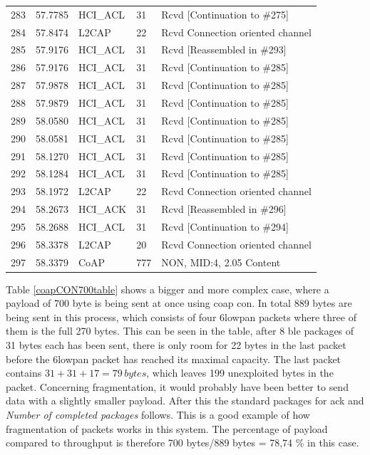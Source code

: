 \begin{table}[H]
\begin{tabular}{lllll}
283    & 57.7785 & HCI\_ACL & 31     & Rcvd {[}Continuation to \#275{]} \\
284    & 57.8474 & L2CAP    & 22     & Rcvd Connection oriented channel \\
285    & 57.9176 & HCI\_ACL & 31     & Rcvd {[}Reassembled in \#293{]}  \\
286    & 57.9176 & HCI\_ACL & 31     & Rcvd {[}Continuation to \#285{]} \\
287    & 57.9878 & HCI\_ACL & 31     & Rcvd {[}Continuation to \#285{]} \\
288    & 57.9879 & HCI\_ACL & 31     & Rcvd {[}Continuation to \#285{]} \\
289    & 58.0580 & HCI\_ACL & 31     & Rcvd {[}Continuation to \#285{]} \\
290    & 58.0581 & HCI\_ACL & 31     & Rcvd {[}Continuation to \#285{]} \\
291    & 58.1270 & HCI\_ACL & 31     & Rcvd {[}Continuation to \#285{]} \\
292    & 58.1284 & HCI\_ACL & 31     & Rcvd {[}Continuation to \#285{]} \\
293    & 58.1972 & L2CAP    & 22     & Rcvd Connection oriented channel \\
294    & 58.2673 & HCI\_ACK & 31     & Rcvd {[}Reassembled in \#296{]}  \\
295    & 58.2688 & HCI\_ACL & 31     & Rcvd {[}Continuation to \#294{]} \\
296    & 58.3378 & L2CAP    & 20     & Rcvd Connection oriented channel \\
297    & 58.3379 & CoAP     & 777    & NON, MID:4, 2.05 Content         \\ \hline
\end{tabular}
\end{table}

\noindent Table \ref{coapCON700table} shows a bigger and more complex case, where a payload of 700 byte is being sent at once using \gls{coap} \gls{con}. In total 889 bytes are being sent in this process, which consists of four \gls{6lowpan} packets where three of them is the full 270 bytes. This can be seen in the table, after 8 \gls{ble} packages of 31 bytes each has been sent, there is only room for 22 bytes in the last packet before the \gls{6lowpan} packet has reached its maximal capacity. The last packet contains $31+31+17 = 79 \, bytes$, which leaves 199 unexploited bytes in the packet. Concerning fragmentation, it would probably have been better to send data with a slightly smaller payload. After this the standard packages for \gls{ack} and \textit{Number of completed packages} follows. This is a good example of how fragmentation of packets works in this system.  The percentage of \gls{payload} compared to \gls{throughput} is therefore 700 bytes/889 bytes = 78,74 \% in this case. 

